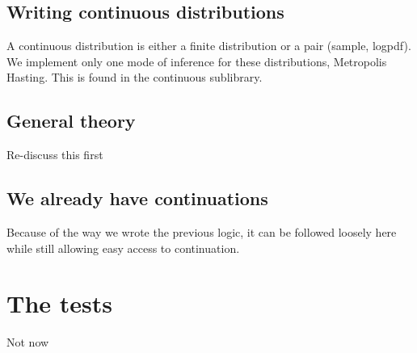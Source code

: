 \documentclass{article}
\newcommand\SC[1]{{\color{violet}{\it \bf Simon :} #1}}
\begin{document}
	\subsection{Writing continuous distributions}

	A continuous distribution is either a finite distribution or a pair (sample, logpdf).
	We implement only one mode of inference for these distributions, Metropolis Hasting.
	This is found in the continuous sublibrary.

	\subsection{General theory}

	\SC{Re-discuss this first}

	\subsection{We already have continuations}

	Because of the way we wrote the previous logic, it can be followed loosely here while still allowing easy access to continuation.


\section{The tests}

\SC{Not now}
\end{document}
